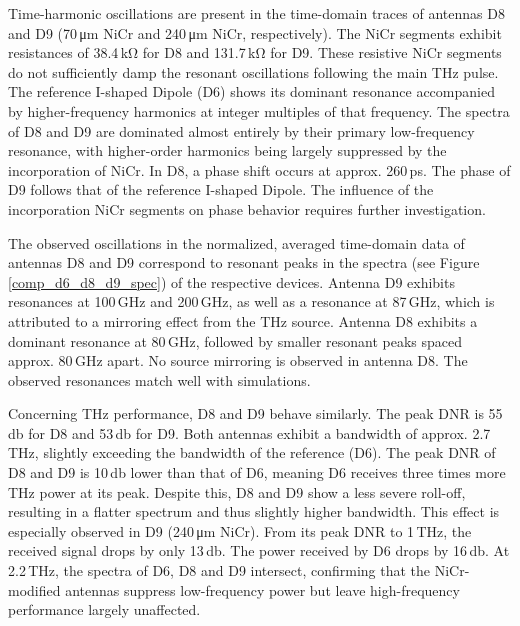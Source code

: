 Time-harmonic oscillations are present in the time-domain traces of antennas D8 and D9 (\num{70}\,\si{\micro \meter} NiCr and \num{240}\,\si{\micro \meter} NiCr, respectively). The NiCr segments exhibit resistances of \num{38.4}\,\si{\kilo \ohm} for D8 and \num{131.7}\,\si{\kilo \ohm} for D9. These resistive NiCr segments do not sufficiently damp the resonant oscillations following the main THz pulse. The reference I-shaped Dipole (D6) shows its dominant resonance accompanied by higher-frequency harmonics at integer multiples of that frequency. The spectra of D8 and D9 are dominated almost entirely by their primary low-frequency resonance, with higher-order harmonics being largely suppressed by the incorporation of NiCr. In D8, a phase shift occurs at approx. \num{260}\,\si{\pico \s}. The phase of D9 follows that of the reference I-shaped Dipole. The influence of the incorporation NiCr segments on phase behavior requires further investigation.

The observed oscillations in the normalized, averaged time-domain data of antennas D8 and D9 correspond to resonant peaks in the spectra (see Figure \ref{comp_d6_d8_d9_spec}) of the respective devices. Antenna D9 exhibits resonances at \num{100}\,\si{\giga \hertz} and \num{200}\,\si{\giga \hertz}, as well as a resonance at \num{87}\,\si{\giga \hertz}, which is attributed to a mirroring effect from the THz source. Antenna D8 exhibits a dominant resonance at \num{80}\,\si{\giga \hertz}, followed by smaller resonant peaks spaced approx. \num{80}\,\si{\giga \hertz} apart. No source mirroring is observed in antenna D8. The observed resonances match well with simulations.

Concerning THz performance, D8 and D9 behave similarly. The peak DNR is \num{55}\,\si{\decibel} for D8 and \num{53}\,\si{\decibel} for D9. Both antennas exhibit a bandwidth of approx. \num{2.7}\,\si{\tera \hertz}, slightly exceeding the bandwidth of the reference (D6). The peak DNR of D8 and D9 is \num{10}\,\si{\decibel} lower than that of D6, meaning D6 receives three times more THz power at its peak. Despite this, D8 and D9 show a less severe roll-off, resulting in a flatter spectrum and thus slightly higher bandwidth. This effect is especially observed in D9 (\num{240}\,\si{\micro \meter} NiCr). From its peak DNR to \num{1}\,\si{\tera \hertz}, the received signal drops by only \num{13}\,\si{\decibel}. The power received by D6 drops by \num{16}\,\si{\decibel}. At \num{2.2}\,\si{\tera \hertz}, the spectra of D6, D8 and D9 intersect, confirming that the NiCr-modified antennas suppress low-frequency power but leave high-frequency performance largely unaffected.

